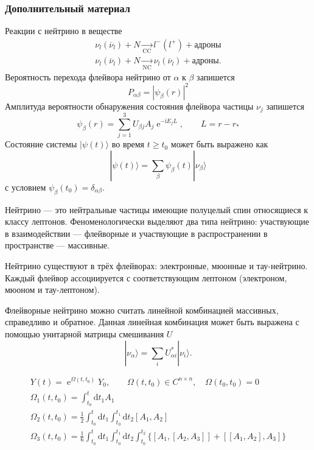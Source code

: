 \documentclass[utf8,9pt,mathserif,usepdftitle=false]{beamer}
\newcommand{\dd}{\mathrm{d}}
\renewcommand{\exp}{\operatorname{e}}
\renewcommand{\imath}{\mathrm{i}}
\begin{document}
\begin{frame}
  \frametitle{Дополнительный материал}%
  Реакции с нейтрино в веществе
  \begin{align*}
    \nu_{l}(\overline{\nu}_{l})+N\xrightarrow[\text{CC}]{}l^{-}(l^{+})+\text{адроны}\\[2ex]
    \nu_{l}(\overline{\nu}_{l})+N\xrightarrow[\text{NC}]{}\nu_{l}(\overline{\nu}_{l})+\text{адроны}.
  \end{align*}
  	Вероятность перехода флейвора нейтрино от \(\alpha\) к \(\beta\) запишется
  \begin{equation}
  	P_{\alpha \beta}=|\psi_{\beta}(r)|^{2}
  \end{equation}
  Амплитуда вероятности обнаружения состояния флейвора частицы \(\nu_{j}\) запишется
  \begin{equation}
  	\psi_{\beta}(r)=\sum_{j=1}^{3}U_{\beta j}A_{j}\exp^{-\imath E_{j}L}, \qquad L=r-r_{*}
  \end{equation}
  Состояние системы \(|\psi(t)\rangle\) во время \(t \geqslant t_{0}\) может быть выражено как
  \begin{equation}
  	|\psi(t)\rangle=\sum_{\beta}\psi_{\beta}(t)|\nu_{\beta}\rangle
  \end{equation}
  с условием \(\psi_{\beta}(t_{0})=\delta_{\alpha \beta}\).
  
   Нейтрино — это нейтральные частицы имеющие полуцелый спин относящиеся к классу
  лептонов. Феноменологически выделяют два типа нейтрино: участвующие в
  взаимодействии — флейворные и участвующие в распространении в пространстве —
  массивные.
  
  Нейтрино существуют в трёх флейворах: электронные, мюонные и
  тау-нейтрино. Каждый флейвор ассоциируется с соответствующим лептоном
  (электроном, мюоном и тау-лептоном).
  
  Флейворные нейтрино можно считать линейной комбинацией массивных, справедливо и 
  обратное. Данная линейная комбинация может быть выражена с помощью унитарной
  матрицы смешивания \(U\)
  \begin{equation}
  	|\nu_{\alpha}\rangle=\sum_{i}U_{\alpha i}^{*}|\nu_{i}\rangle.
  \end{equation}
  
 \begin{align}
 	Y(t)=\exp^{\Omega(t,t_{0})}Y_{0}, \qquad \Omega(t,t_{0})\in C^{n\times n},\quad 
 	\Omega(t_{0},t_{0})=0\\
 	\Omega_{1}(t,t_{0})=\int_{t_{0}}^{t}\dd t_{1}A_{1}\\
 	\Omega_{2}(t,t_{0})=\frac{1}{2}\int_{t_{0}}^{t}\dd t_{1}\int_{t_{0}}^{t_{1}}\dd t_{2}[A_{1},A_{2}]\\
 	\Omega_{3}(t,t_{0})=\frac{1}{6}\int_{t_{0}}^{t}\dd t_{1}\int_{t_{0}}^{t_{1}}\dd 
 	t_{2}\int_{t_{0}}^{t_{2}}\{[A_{1},[A_{2},A_{3}]]+[[A_{1},A_{2}],A_{3}]\}
 \end{align}
  
\end{frame}
\end{document}
